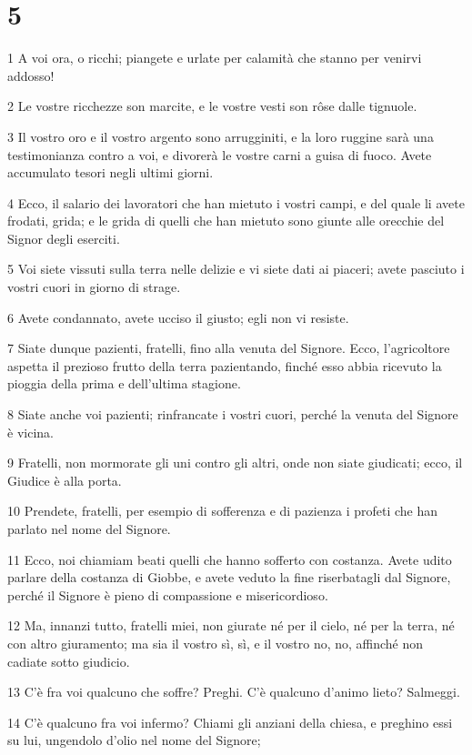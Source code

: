\chapter{5}

\par 1 A voi ora, o ricchi; piangete e urlate per calamità che stanno per venirvi addosso!
\par 2 Le vostre ricchezze son marcite, e le vostre vesti son rôse dalle tignuole.
\par 3 Il vostro oro e il vostro argento sono arrugginiti, e la loro ruggine sarà una testimonianza contro a voi, e divorerà le vostre carni a guisa di fuoco. Avete accumulato tesori negli ultimi giorni.
\par 4 Ecco, il salario dei lavoratori che han mietuto i vostri campi, e del quale li avete frodati, grida; e le grida di quelli che han mietuto sono giunte alle orecchie del Signor degli eserciti.
\par 5 Voi siete vissuti sulla terra nelle delizie e vi siete dati ai piaceri; avete pasciuto i vostri cuori in giorno di strage.
\par 6 Avete condannato, avete ucciso il giusto; egli non vi resiste.
\par 7 Siate dunque pazienti, fratelli, fino alla venuta del Signore. Ecco, l'agricoltore aspetta il prezioso frutto della terra pazientando, finché esso abbia ricevuto la pioggia della prima e dell'ultima stagione.
\par 8 Siate anche voi pazienti; rinfrancate i vostri cuori, perché la venuta del Signore è vicina.
\par 9 Fratelli, non mormorate gli uni contro gli altri, onde non siate giudicati; ecco, il Giudice è alla porta.
\par 10 Prendete, fratelli, per esempio di sofferenza e di pazienza i profeti che han parlato nel nome del Signore.
\par 11 Ecco, noi chiamiam beati quelli che hanno sofferto con costanza. Avete udito parlare della costanza di Giobbe, e avete veduto la fine riserbatagli dal Signore, perché il Signore è pieno di compassione e misericordioso.
\par 12 Ma, innanzi tutto, fratelli miei, non giurate né per il cielo, né per la terra, né con altro giuramento; ma sia il vostro sì, sì, e il vostro no, no, affinché non cadiate sotto giudicio.
\par 13 C'è fra voi qualcuno che soffre? Preghi. C'è qualcuno d'animo lieto? Salmeggi.
\par 14 C'è qualcuno fra voi infermo? Chiami gli anziani della chiesa, e preghino essi su lui, ungendolo d'olio nel nome del Signore;
